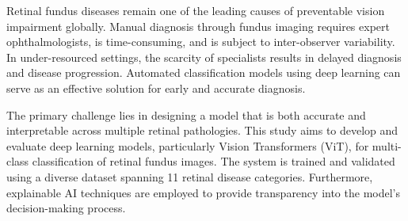 \documentclass[a4paper,12pt]{report}
\begin{document}
Retinal fundus diseases remain one of the leading causes of preventable vision impairment globally. Manual diagnosis through fundus imaging requires expert ophthalmologists, is time-consuming, and is subject to inter-observer variability. In under-resourced settings, the scarcity of specialists results in delayed diagnosis and disease progression. Automated classification models using deep learning can serve as an effective solution for early and accurate diagnosis.

The primary challenge lies in designing a model that is both accurate and interpretable across multiple retinal pathologies. This study aims to develop and evaluate deep learning models, particularly Vision Transformers (ViT), for multi-class classification of retinal fundus images. The system is trained and validated using a diverse dataset spanning 11 retinal disease categories. Furthermore, explainable AI techniques are employed to provide transparency into the model’s decision-making process.




\end{document}
